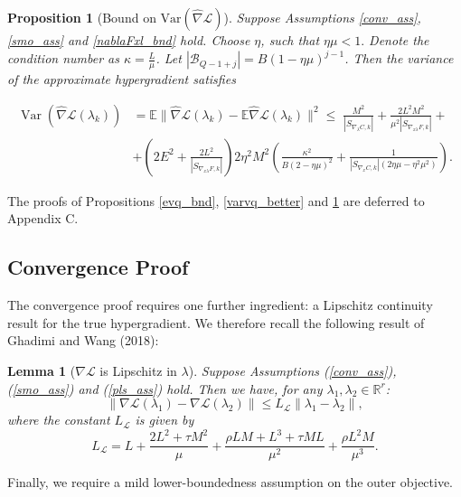 \documentclass[11pt, twoside]{report}
\newtheorem{proposition}[theorem]{Proposition}
\newtheorem{lemma}[theorem]{Lemma}
\begin{document}
\begin{proposition}[Bound on $\mathrm{Var}(\widehat{\nabla} \mathcal{L})$] \label{bound_nabla_hat}
Suppose Assumptions \ref{conv_ass}, \ref{smo_ass} and \ref{nablaFxl_bnd} hold. Choose $\eta$, such that $\eta \mu < 1.$ Denote the condition number as $\kappa = \frac{L}{\mu}$. Let $|\mathcal{B}_{Q-1+j}| = B(1-\eta\mu)^{j-1}$. Then the variance of the approximate hypergradient satisfies

\[
\begin{aligned}
\operatorname{Var}(\widehat{\nabla}\mathcal L(\lambda_k)) &= \mathbb{E}\|\widehat{\nabla} \mathcal{L}(\lambda_k) - \mathbb{E}\widehat{\nabla} \mathcal{L}(\lambda_k)\|^2
\leq\;
\frac{M^2}{|S_{\nabla_\lambda C,k}|}
+
\frac{2L^2M^2}{\mu^2|S_{\nabla_{x\lambda}F,k}|} + \\
&+
\left(
2E^2+\frac{2L^2}{|S_{\nabla_{x\lambda}F,k}|}
\right)
2\eta^2M^2
\left(
\frac{\kappa^2}{B(2-\eta\mu)^2}
+
\frac{1}{|S_{\nabla_x C,k}|(2\eta\mu-\eta^2\mu^2)}
\right).
\end{aligned}
\]

\end{proposition}

The proofs of Propositions \ref{evq_bnd}, \ref{varvq_better} and \ref{bound_nabla_hat} are deferred to Appendix C.

\subsection{Convergence Proof}
The convergence proof requires one further ingredient: a Lipschitz continuity result for the true hypergradient. We therefore recall the following result of Ghadimi and Wang (2018)\cite{ghadimi2018approximation}:
\begin{lemma}[$\nabla \mathcal{L}$ is Lipschitz in $\lambda$] \label{nab_lip}
Suppose Assumptions (\ref{conv_ass}), (\ref{smo_ass}) and (\ref{pls_ass}) hold. Then we have, for any $\lambda_1, \lambda_2 \in \mathbb{R}^r$:
\[\|\nabla \mathcal{L}(\lambda_1) - \nabla \mathcal{L}(\lambda_2)\| \leq L_{\mathcal{L}} \|\lambda_1 - \lambda_2\|,\]
where the constant $L_{\mathcal{L}}$ is given by
\[L_{\mathcal{L}} = L + \frac{2L^2 + \tau M^2}{\mu} + \frac{\rho L M + L^3 + \tau M L}{\mu^2} + \frac{\rho L^2 M}{\mu^3}.\]
\end{lemma}
Finally, we require a mild lower-boundedness assumption on the outer objective.
\end{document}
